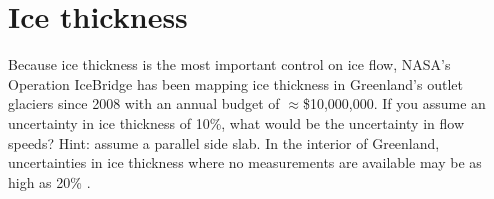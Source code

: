 \documentclass[parskip=half]{scrartcl}
\begin{document}
\section{Ice thickness}

Because ice thickness is the most important control on ice flow, NASA's Operation IceBridge has been mapping ice thickness in Greenland's outlet glaciers since 2008 with an annual budget of $\approx$\$10,000,000. If you assume an uncertainty in ice thickness of 10\%, what would be the uncertainty in flow speeds? Hint: assume a parallel side slab. In the interior of Greenland, uncertainties in ice thickness where no measurements are available may be as high as 20\% \citep{Brinkerhoff2016}.


\end{document}
